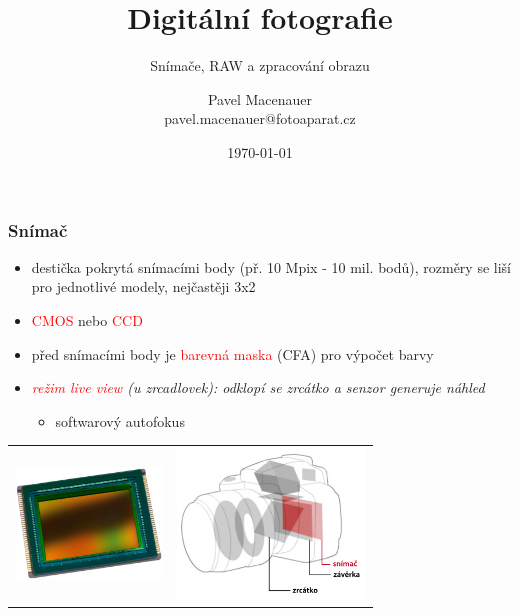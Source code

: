 \documentclass{beamer}
\title{\textbf{Digitální fotografie}}
\subtitle{Snímače, RAW a zpracování obrazu}
\author{Pavel Macenauer \\ \tiny{pavel.macenauer@fotoaparat.cz}}
\date{\tiny{\today}}
\institute[FIT VUTBR]
{
	\inst{}
	Fakulta Informačních Technologií \\
	Vysoké Učení Technické v Brně
}
\begin{document}
	\begin{frame}[t,plain]
	\titlepage
	\tableofcontents[currentsection]
	\vspace{-7mm}
	\end{frame}


	\begin{frame}[t,fragile]
		\frametitle{Snímač}	
		
		\begin{itemize}
			\item destička pokrytá snímacími body (př. 10 Mpix - 10 mil. bodů), rozměry se liší pro jednotlivé modely, nejčastěji 3x2
			\item \textcolor{red}{CMOS} nebo \textcolor{red}{CCD}	
			\item před snímacími body je \textcolor{red}{barevná maska} (CFA) pro výpočet barvy
			\item \textit{\textcolor{red}{režim live view} (u zrcadlovek): odklopí se zrcátko a senzor generuje náhled}
			\begin{itemize}
				\item softwarový autofokus
			\end{itemize}
		\end{itemize}	
		

		\vspace{-8mm}\center\begin{tabular}{ll}
			\includegraphics[height=30mm]{cmos-real.jpg} &		
			\includegraphics[height=40mm]{sensor.pdf}

		\end{tabular}

				
	\end{frame}
	
\end{document}
